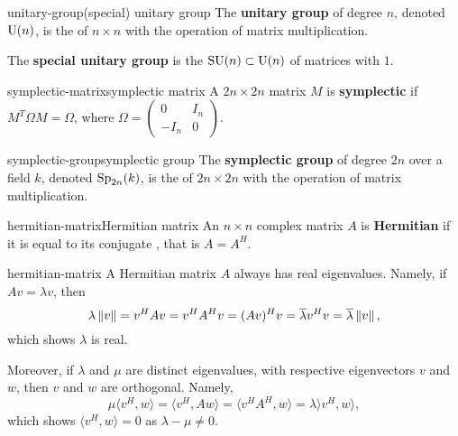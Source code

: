 \begin{topic}{unitary-group}{(special) unitary group}
    The \textbf{unitary group} of degree $n$, denoted $\textup{U}(n)$, is the  of $n \times n$  with the operation of matrix multiplication.
    
    The \textbf{special unitary group} is the  $\textup{SU}(n) \subset \textup{U}(n)$ of matrices with  $1$.
\end{topic}

\begin{topic}{symplectic-matrix}{symplectic matrix}
    A $2n \times 2n$ matrix $M$ is \textbf{symplectic} if $M^T \Omega M = \Omega$, where $\Omega = \begin{pmatrix} 0 & I_n \\ -I_n & 0 \end{pmatrix}$.
\end{topic}

\begin{topic}{symplectic-group}{symplectic group}
    The \textbf{symplectic group} of degree $2n$ over a field $k$, denoted $\textup{Sp}_{2n}(k)$, is the  of $2n \times 2n$  with the operation of matrix multiplication.
\end{topic}

\begin{topic}{hermitian-matrix}{Hermitian matrix}
    An $n \times n$ complex matrix $A$ is \textbf{Hermitian} if it is equal to its conjugate , that is $A = A^H$.
\end{topic}

\begin{example}{hermitian-matrix}
    A Hermitian matrix $A$ always has real eigenvalues. Namely, if $Av = \lambda v$, then
    \[ \lambda \left\|v\right\| = v^H A v = v^H A^H v = (A v)^H v = \overline{\lambda} v^H v = \overline{\lambda} \left\|v\right\| , \]
    which shows $\lambda$ is real.
    
    Moreover, if $\lambda$ and $\mu$ are distinct eigenvalues, with respective eigenvectors $v$ and $w$, then $v$ and $w$ are orthogonal. Namely,
    \[ \mu \langle v^H, w \rangle = \langle v^H, A w \rangle = \langle v^H A^H, w \rangle = \lambda \rangle v^H, w \rangle , \]
    which shows $\langle v^H, w \rangle = 0$ as $\lambda - \mu \ne 0$.
\end{example}


